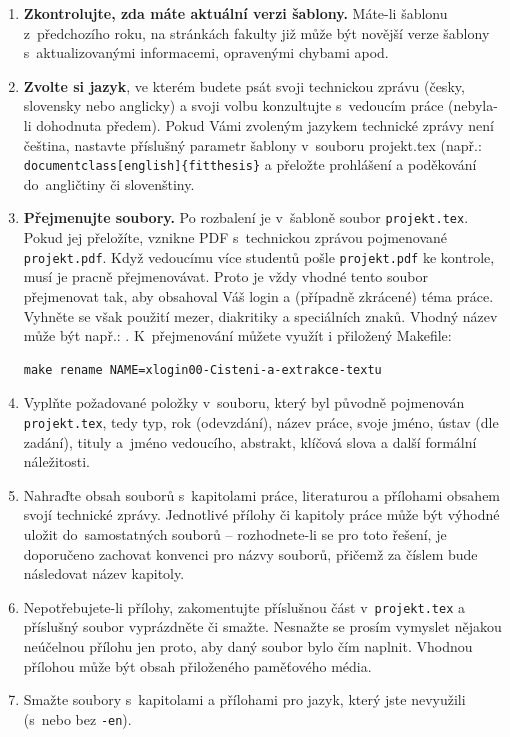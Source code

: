 \begin{enumerate}
  \item \textbf{Zkontrolujte, zda máte aktuální verzi šablony.} Máte-li šablonu z~předchozího roku, na stránkách fakulty již může být novější verze šablony s~aktualizovanými informacemi, opravenými chybami apod.
  \item \textbf{Zvolte si jazyk}, ve kterém budete psát svoji technickou zprávu (česky, slovensky nebo anglicky) a svoji volbu konzultujte s~vedoucím práce (nebyla-li dohodnuta předem). Pokud Vámi zvoleným jazykem technické zprávy není čeština, nastavte příslušný parametr šablony v~souboru projekt.tex (např.: \verb|document|\verb|class[english]{fitthesis}| a přeložte prohlášení a poděkování do~angličtiny či slovenštiny.
  \item \textbf{Přejmenujte soubory.} Po rozbalení je v~šabloně soubor \texttt{projekt.tex}. Pokud jej přeložíte, vznikne PDF s~technickou zprávou pojmenované \texttt{projekt.pdf}. Když vedoucímu více studentů pošle \texttt{projekt.pdf} ke kontrole, musí je pracně přejmenovávat. Proto je vždy vhodné tento soubor přejmenovat tak, aby obsahoval Váš login a (případně zkrácené) téma práce. Vyhněte se však použití mezer, diakritiky a speciálních znaků. Vhodný název může být např.: . K~přejmenování můžete využít i přiložený Makefile:
\begin{verbatim}
make rename NAME=xlogin00-Cisteni-a-extrakce-textu
\end{verbatim}
  \item Vyplňte požadované položky v~souboru, který byl původně pojmenován \texttt{projekt.tex}, tedy typ, rok (odevzdání), název práce, svoje jméno, ústav (dle zadání), tituly a~jméno vedoucího, abstrakt, klíčová slova a další formální náležitosti.
  \item Nahraďte obsah souborů s~kapitolami práce, literaturou a přílohami obsahem svojí technické zprávy. Jednotlivé přílohy či kapitoly práce může být výhodné uložit do~samostatných souborů -- rozhodnete-li se pro toto řešení, je doporučeno zachovat konvenci pro názvy souborů, přičemž za číslem bude následovat název kapitoly. 
  \item Nepotřebujete-li přílohy, zakomentujte příslušnou část v~\texttt{projekt.tex} a příslušný soubor vyprázdněte či smažte. Nesnažte se prosím vymyslet nějakou neúčelnou přílohu jen proto, aby daný soubor bylo čím naplnit. Vhodnou přílohou může být obsah přiloženého paměťového média.
  \item Smažte soubory s~kapitolami a přílohami pro jazyk, který jste nevyužili (s~nebo bez \texttt{-en}).

\end{enumerate}
